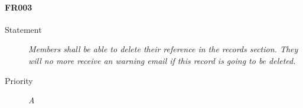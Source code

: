 \paragraph{FR003}
  \begin{description}
  \item [Statement] 
    \textit{ Members shall be able to delete their reference in the records section.
			They will no more receive an warning email if this record is going to be deleted.}
  \item [Priority] \textit{A}
\end{description}
